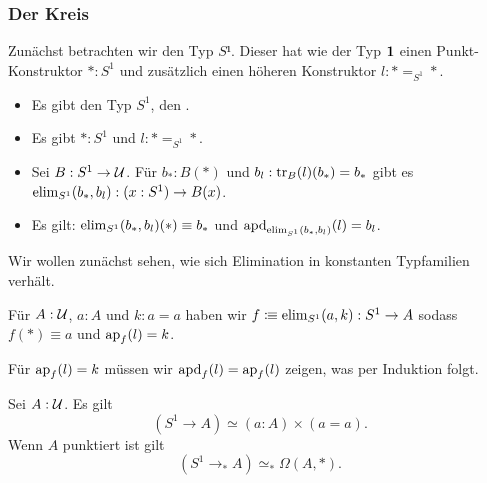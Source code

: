 \subsubsection*{Der Kreis}
Zunächst betrachten wir den Typ $S¹$.
Dieser hat wie der Typ $\mathbf{1}$ einen Punkt-Konstruktor $\ast:S^1$ und zusätzlich einen höheren Konstruktor $l:\ast =_{S^1}\ast$.

\begin{regeln}
  \begin{itemize}
  \item Es gibt den Typ $S^1$, den .
  \item Es gibt $\ast:S^1$ und $l:\ast=_{S^1}\ast$.
  \item Sei $B:S^1\to \mathcal{U}$. Für $b_\ast:B(\ast)$ und $b_l:\mathrm{tr}_B(l)(b_\ast)=b_\ast$
    gibt es $\mathrm{elim}_{S^1}(b_\ast,b_l):(x:S^1)\to B(x)$.
  \item Es gilt: $\mathrm{elim}_{S^1}(b_\ast,b_l)(\ast)\equiv b_\ast$ und $\mathrm{apd}_{\mathrm{elim}_{S^1}(b_\ast,b_l)}(l)=b_l$.
  \end{itemize}
\end{regeln}

Wir wollen zunächst sehen, wie sich Elimination in konstanten Typfamilien verhält.

\begin{bemerkung}
  Für $A : \mathcal{U}$, $a:A$ und $k:a=a$ haben wir $f\vcentcolon\mspace{-1.2mu}\equiv \mathrm{elim}_{S^1}(a,k):S^1\to A$ sodass
  $f(\ast)\equiv a$ und $\mathrm{ap}_f(l)=k$.
\end{bemerkung}

\begin{beweis}
  Für $\mathrm{ap}_f(l)=k$ müssen wir $\mathrm{apd}_{f}(l)=\mathrm{ap}_f(l)$ zeigen, was per Induktion folgt.
\end{beweis}

\begin{lemma}
  Sei $A:\mathcal{U}$. Es gilt
  \[
    (S^1\to A) \simeq (a:A)\times (a=a).
  \]
  Wenn $A$ punktiert ist gilt
  \[
    (S^1\to_\ast A)\simeq_\ast \Omega(A,\ast).
  \]
\end{lemma}

